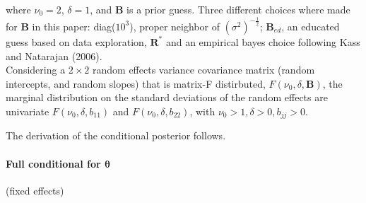 \documentclass[a4paper]{article}
\begin{document}
where $\nu_0 = 2$, $\delta = 1$, and $\bm{B}$ is a prior guess. Three different choices where made for $\bm{B}$ in this paper: diag($10^3$), proper neighbor of $(\sigma^2)^{-\frac{1}{2}}$; $\bm{B}_{ed}$, an educated guess based on data exploration, $\bm{R^*}$ and an empirical bayes choice following Kass and Natarajan (2006). \\
Considering a $2 \times 2$ random effects variance covariance matrix (random intercepts, and random slopes) that is matrix-F distirbuted, $F(\nu_0, \delta, \bm{B})$, the marginal distribution on the standard deviations of the random effects are univariate $F(\nu_0, \delta, b_{11})$ and $F(\nu_0, \delta, b_{22})$, with $\nu_0 >1, \delta > 0, b_{jj} > 0$.

\vspace{5mm}

The derivation of the conditional posterior follows.

\paragraph{Full conditional for $\bm{\theta}$}(fixed effects) \\
\end{document}
